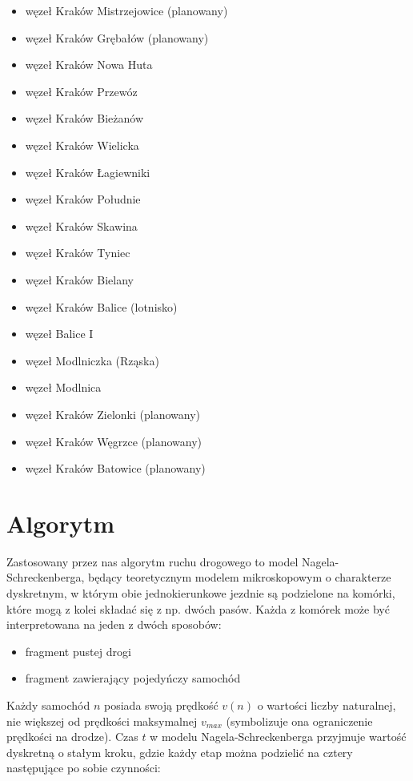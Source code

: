 \documentclass[a4paper,12pt]{article}
\begin{document}
	\begin{itemize}
		\item węzeł Kraków Mistrzejowice (planowany)
		\item węzeł Kraków Grębałów (planowany)
		\item węzeł Kraków Nowa Huta
		\item węzeł Kraków Przewóz
		\item węzeł Kraków Bieżanów
		\item węzeł Kraków Wielicka
		\item węzeł Kraków Łagiewniki
		\item węzeł Kraków Południe
		\item węzeł Kraków Skawina
		\item węzeł Kraków Tyniec
		\item węzeł Kraków Bielany
		\item węzeł Kraków Balice (lotnisko)
		\item węzeł Balice I
		\item węzeł Modlniczka (Rząska)
		\item węzeł Modlnica
		\item węzeł Kraków Zielonki (planowany)
		\item węzeł Kraków Węgrzce (planowany)
		\item węzeł Kraków Batowice (planowany)
	\end{itemize}

    \section{Algorytm}
    Zastosowany przez nas algorytm ruchu drogowego to model Nagela-Schreckenberga, będący teoretycznym modelem mikroskopowym o charakterze dyskretnym, w którym obie jednokierunkowe jezdnie są podzielone na komórki, które mogą z kolei składać się z np. dwóch pasów. Każda z komórek może być interpretowana na jeden z dwóch sposobów:
    
    \begin{itemize}
    	\item fragment pustej drogi
    	\item fragment zawierający pojedyńczy samochód
    \end{itemize}


	Każdy samochód $n$ posiada swoją prędkość $v(n)$ o wartości liczby naturalnej, nie większej od prędkości maksymalnej $v_{max}$ (symbolizuje ona ograniczenie prędkości na drodze).
	Czas $t$ w modelu Nagela-Schreckenberga przyjmuje wartość dyskretną o stałym kroku, gdzie każdy etap można podzielić na cztery następujące po sobie czynności:
\end{document}
